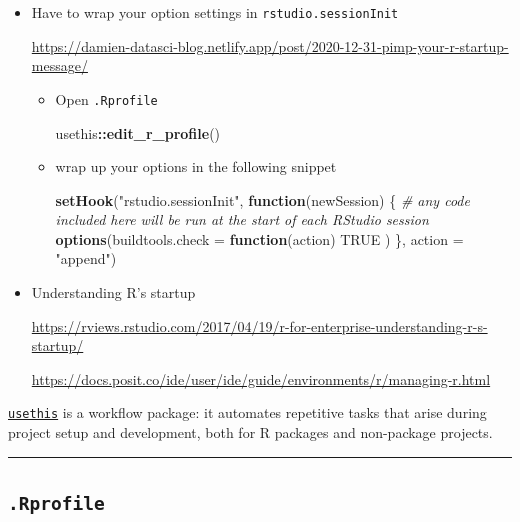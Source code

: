 \documentclass[
  a4paper,
  twoside,
  openright]{book}
\newenvironment{Shaded}{\begin{snugshade}}{\end{snugshade}}
\newcommand{\AttributeTok}[1]{\textcolor[rgb]{0.13,0.29,0.53}{#1}}
\newcommand{\CommentTok}[1]{\textcolor[rgb]{0.56,0.35,0.01}{\textit{#1}}}
\newcommand{\ConstantTok}[1]{\textcolor[rgb]{0.56,0.35,0.01}{#1}}
\newcommand{\ControlFlowTok}[1]{\textcolor[rgb]{0.13,0.29,0.53}{\textbf{#1}}}
\newcommand{\FunctionTok}[1]{\textcolor[rgb]{0.13,0.29,0.53}{\textbf{#1}}}
\newcommand{\NormalTok}[1]{#1}
\newcommand{\SpecialCharTok}[1]{\textcolor[rgb]{0.81,0.36,0.00}{\textbf{#1}}}
\newcommand{\StringTok}[1]{\textcolor[rgb]{0.31,0.60,0.02}{#1}}
\theoremstyle{definition}
\theoremstyle{definition}
\theoremstyle{definition}
\theoremstyle{definition}
\theoremstyle{remark}
\begin{document}
\begin{itemize}
\item
  Have to {wrap your option settings in \texttt{rstudio.sessionInit}}

  \url{https://damien-datasci-blog.netlify.app/post/2020-12-31-pimp-your-r-startup-message/}

  \begin{itemize}
  \item
    Open \texttt{.Rprofile}

\begin{Shaded}
\begin{Highlighting}[]
\NormalTok{usethis}\SpecialCharTok{::}\FunctionTok{edit\_r\_profile}\NormalTok{()}
\end{Highlighting}
\end{Shaded}
  \item
    wrap up your options in the following snippet

\begin{Shaded}
\begin{Highlighting}[]
\FunctionTok{setHook}\NormalTok{(}\StringTok{"rstudio.sessionInit"}\NormalTok{, }\ControlFlowTok{function}\NormalTok{(newSession) \{}
  \CommentTok{\# any code included here will be run at the start of each RStudio session}
  \FunctionTok{options}\NormalTok{(}\AttributeTok{buildtools.check =} \ControlFlowTok{function}\NormalTok{(action) }\ConstantTok{TRUE}\NormalTok{ )}
\NormalTok{\}, }\AttributeTok{action =} \StringTok{"append"}\NormalTok{)}
\end{Highlighting}
\end{Shaded}
  \end{itemize}
\item
  Understanding R's startup

  \url{https://rviews.rstudio.com/2017/04/19/r-for-enterprise-understanding-r-s-startup/}

  \url{https://docs.posit.co/ide/user/ide/guide/environments/r/managing-r.html}
\end{itemize}

\href{https://usethis.r-lib.org/reference/index.html}{\texttt{usethis}} is a workflow package: it automates repetitive tasks that arise during project setup and development, both for R packages and non-package projects.

\begin{center}\rule{0.5\linewidth}{0.5pt}\end{center}

\subsection{\texorpdfstring{\texttt{.Rprofile}}{.Rprofile}}\label{rprofile}
\end{document}
